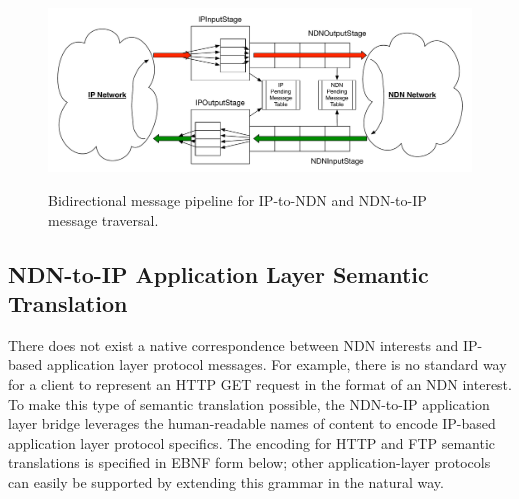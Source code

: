 \begin{figure}[ht!]
\begin{center}
\includegraphics[scale=0.45]{./images/pipeline.pdf}
\label{fig:pipeline}
\caption{Bidirectional message pipeline for IP-to-NDN and NDN-to-IP message traversal.}
\end{center}
\end{figure}




\subsection{NDN-to-IP Application Layer Semantic Translation}
There does not exist a native correspondence between NDN interests and IP-based application layer protocol messages. For example, there is no standard way for a client to represent an HTTP GET request in the format of an NDN interest. To make this type of semantic translation possible, the NDN-to-IP application layer bridge leverages the human-readable names of content to encode IP-based application layer protocol specifics. The encoding for HTTP and FTP semantic translations is specified in EBNF form below; other application-layer protocols can easily be supported by extending this grammar in the natural way.

